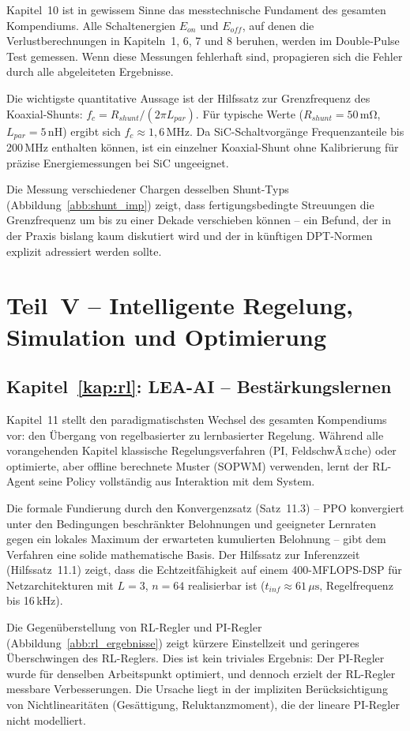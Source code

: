 ﻿\documentclass[a4paper,12pt,openany,oneside]{book}
\newcommand{\abschnitt}[1]{\section{#1}}
\newcommand{\unterabschnitt}[1]{\subsection{#1}}
\theoremstyle{definition}
\begin{document}
Kapitel~10 ist in gewissem Sinne das messtechnische Fundament des gesamten Kompendiums.
Alle Schaltenergien $E_{on}$ und $E_{off}$, auf denen die Verlustberechnungen in
Kapiteln~1, 6, 7 und 8 beruhen, werden im Double-Pulse Test gemessen. Wenn diese
Messungen fehlerhaft sind, propagieren sich die Fehler durch alle abgeleiteten Ergebnisse.

Die wichtigste quantitative Aussage ist der Hilfssatz zur Grenzfrequenz des Koaxial-Shunts:
$f_c = R_{shunt}/(2\pi L_{par})$. F\"ur typische Werte ($R_{shunt} = 50\,\mathrm{m\Omega}$,
$L_{par} = 5\,\mathrm{nH}$) ergibt sich $f_c \approx 1{,}6\,\mathrm{MHz}$. Da
SiC-Schaltvorg\"ange Frequenzanteile bis 200\,MHz enthalten k\"onnen, ist ein einzelner
Koaxial-Shunt ohne Kalibrierung f\"ur pr\"azise Energiemessungen bei SiC ungeeignet.

Die Messung verschiedener Chargen desselben Shunt-Typs (Abbildung~\ref{abb:shunt_imp})
zeigt, dass fertigungsbedingte Streuungen die Grenzfrequenz um bis zu einer Dekade
verschieben k\"onnen -- ein Befund, der in der Praxis bislang kaum diskutiert wird
und der in k\"unftigen DPT-Normen explizit adressiert werden sollte.

\abschnitt{Teil~V -- Intelligente Regelung, Simulation und Optimierung}

\unterabschnitt{Kapitel~\ref{kap:rl}: LEA-AI -- Best\"arkungslernen}

Kapitel~11 stellt den paradigmatischsten Wechsel des gesamten Kompendiums vor: den
\"Ubergang von regelbasierter zu lernbasierter Regelung. W\"ahrend alle vorangehenden
Kapitel klassische Regelungsverfahren (PI, FeldschwÃ¤che) oder optimierte, aber offline
berechnete Muster (SOPWM) verwenden, lernt der RL-Agent seine Policy vollst\"andig
aus Interaktion mit dem System.

Die formale Fundierung durch den Konvergenzsatz (Satz~11.3) -- PPO konvergiert
unter den Bedingungen beschr\"ankter Belohnungen und geeigneter Lernraten gegen
ein lokales Maximum der erwarteten kumulierten Belohnung -- gibt dem Verfahren eine
solide mathematische Basis. Der Hilfssatz zur Inferenzzeit (Hilfssatz~11.1) zeigt,
dass die Echtzeitf\"ahigkeit auf einem 400-MFLOPS-DSP f\"ur Netzarchitekturen mit
$L = 3$, $n = 64$ realisierbar ist ($t_{inf} \approx 61\,\mu\mathrm{s}$,
Regelfrequenz bis 16\,kHz).

Die Gegen\"uberstellung von RL-Regler und PI-Regler (Abbildung~\ref{abb:rl_ergebnisse})
zeigt k\"urzere Einstellzeit und geringeres \"Uberschwingen des RL-Reglers. Dies ist
kein triviales Ergebnis: Der PI-Regler wurde f\"ur denselben Arbeitspunkt optimiert,
und dennoch erzielt der RL-Regler messbare Verbesserungen. Die Ursache liegt in der
impliziten Ber\"ucksichtigung von Nichtlinearit\"aten (Ges\"attigung, Reluktanzmoment),
die der lineare PI-Regler nicht modelliert.
\end{document}
